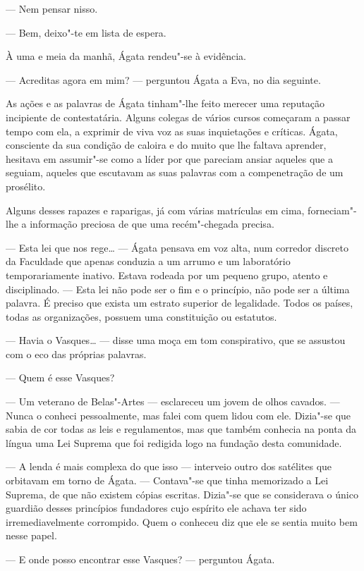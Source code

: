 --- Nem pensar nisso.

--- Bem, deixo"-te em lista de espera.

À uma e meia da manhã, Ágata rendeu"-se à evidência.

--- Acreditas agora em mim? --- perguntou Ágata a Eva, no dia seguinte.

As ações e as palavras de Ágata tinham"-lhe feito merecer uma reputação
incipiente de contestatária. Alguns colegas de vários cursos começaram a
passar tempo com ela, a exprimir de viva voz as suas inquietações e
críticas. Ágata, consciente da sua condição de caloira e do muito que
lhe faltava aprender, hesitava em assumir"-se como a líder por que pareciam ansiar aqueles que
a seguiam, aqueles que escutavam as suas palavras com a compenetração de
um prosélito.

Alguns desses rapazes e raparigas, já com várias matrículas em cima,
forneciam"-lhe a informação preciosa de que uma recém"-chegada precisa.

--- Esta lei que nos rege\ldots{} --- Ágata pensava em voz alta, num corredor
discreto da Faculdade que apenas conduzia a um arrumo e um laboratório
temporariamente inativo. Estava rodeada por um pequeno grupo, atento e
disciplinado. --- Esta lei não pode ser o fim e o princípio, não pode ser a última
palavra. É preciso que exista um estrato superior de legalidade. Todos
os países, todas as organizações, possuem uma constituição ou
estatutos.

--- Havia o Vasques\ldots{} --- disse uma moça em tom conspirativo, que se
assustou com o eco das próprias palavras.

--- Quem é esse Vasques?

--- Um veterano de Belas"-Artes --- esclareceu um jovem de olhos cavados.
--- Nunca o conheci pessoalmente, mas falei com quem lidou com ele.
Dizia"-se que sabia de cor todas as leis e regulamentos, mas que
também conhecia na ponta da língua uma Lei Suprema que foi redigida
logo na fundação desta comunidade.

--- A lenda é mais complexa do que isso --- interveio outro dos
satélites que orbitavam em torno de Ágata. --- Contava"-se que tinha
memorizado a Lei Suprema, de que não existem cópias escritas.
Dizia"-se que se considerava o único guardião desses princípios
fundadores cujo espírito ele achava ter sido irremediavelmente
corrompido. Quem o conheceu diz que ele se sentia muito bem nesse
papel.

--- E onde posso encontrar esse Vasques? --- perguntou Ágata.


